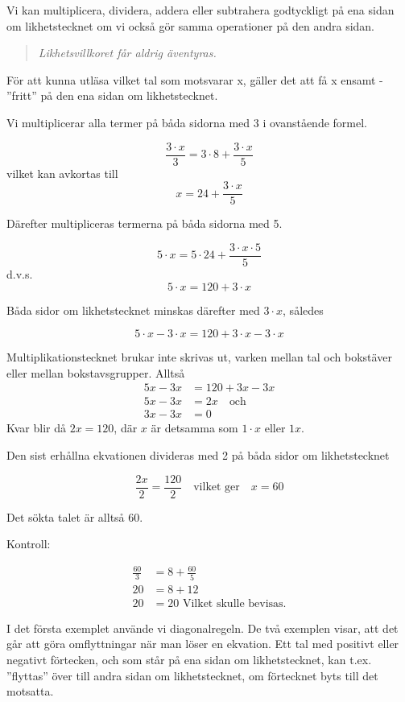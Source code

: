 Vi kan multiplicera, dividera, addera eller subtrahera godtyckligt på ena sidan
om likhetstecknet om vi också gör samma operationer på den andra sidan.

\begin{quote}\emph{
Likhetsvillkoret får aldrig äventyras.
}\end{quote}

För att kunna utläsa vilket tal som motsvarar x, gäller det att få x ensamt -
''fritt'' på den ena sidan om likhetstecknet.

Vi multiplicerar alla termer på båda sidorna med 3 i ovanstående formel.

\[\frac{3 \cdot x}{3} = 3 \cdot 8 + \frac{3 \cdot x}{5}\]
vilket kan avkortas till
\[x = 24 + \frac{3 \cdot x}{5}\]

Därefter multipliceras termerna på båda sidorna med 5.

\[5 \cdot  x = 5 \cdot 24 + \frac{3 \cdot x \cdot 5}{5}\]
d.v.s.
\[5 \cdot x = 120 + 3 \cdot x\]

Båda sidor om likhetstecknet minskas därefter med \(3 \cdot x\), således

\[5 \cdot x - 3 \cdot x = 120 + 3 \cdot x - 3 \cdot x\]

Multiplikationstecknet brukar inte skrivas ut, varken mellan tal och bokstäver
eller mellan bokstavsgrupper. Alltså
\begin{align*}
5x - 3x &= 120 + 3x - 3x \\
5x - 3x &= 2x \quad \text{och} \\
3x - 3x &= 0
\end{align*}
Kvar blir då \(2x = 120\), där \(x\) är detsamma som \(1 \cdot x\) eller \(1x\).

Den sist erhållna ekvationen divideras med 2 på båda sidor om likhetstecknet

\[
\frac{2x}{2} = \frac{120}{2}
\quad \text{vilket ger} \quad
x = 60
\]

Det sökta talet är alltså 60.

Kontroll:

\begin{align*}
\frac{60}{3} & = 8 + \frac{60}{5}\\
          20 &= 8 + 12 \\
          20 &= 20\text{ Vilket skulle bevisas.}
\end{align*}


I det första exemplet använde vi diagonalregeln. De två exemplen visar, att det
går att göra omflyttningar när man löser en ekvation. Ett tal med positivt eller
negativt förtecken, och som står på ena sidan om likhetstecknet, kan t.ex.
''flyttas'' över till andra sidan om likhetstecknet, om förtecknet byts till det
motsatta.

